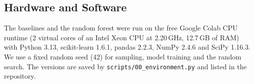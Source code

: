 \subsection{Hardware and Software}
\label{sec:method-env}

The baselines and the random forest were run on the free Google Colab CPU runtime (2 virtual cores
of an Intel Xeon CPU at 2.20\,GHz, 12.7\,GB of RAM) with Python 3.13, scikit-learn 1.6.1, pandas
2.2.3, NumPy 2.4.6 and SciPy 1.16.3. We use a fixed random seed (42) for sampling, model training and
the random search. The versions are saved by \texttt{scripts/00\_environment.py} and listed in the
repository.

